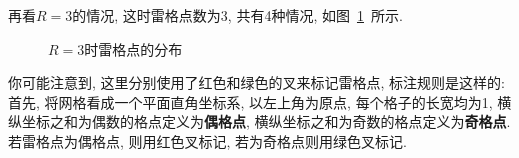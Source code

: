 \documentclass{ctexart}
\newcommand{\redcross}[2]{
    \begin{scope}[thick,color = red,shift={(#1,#2)}]
        \draw (0.05,-0.05) -- (-0.05,0.05);
        \draw (-0.05,-0.05) -- (0.05,0.05);
    \end{scope}
}
\newcommand{\greencross}[2]{
    \begin{scope}[thick,color = green,shift={(#1,#2)}]
        \draw (0.05,-0.05) -- (-0.05,0.05);
        \draw (-0.05,-0.05) -- (0.05,0.05);
    \end{scope}
}
\begin{document}
再看$R = 3$的情况, 这时雷格点数为3, 共有4种情况, 如图\ \ref{example3}\ 所示.
\begin{figure}[ht]
    \caption{$R=3$时雷格点的分布}
    \label{example3}
\end{figure}

你可能注意到, 这里分别使用了红色和绿色的叉来标记雷格点, 标注规则是这样的: 首先, 将网格看成一个平面直角坐标系, 以左上角为原点, 每个格子的长宽均为1, 横纵坐标之和为偶数的格点定义为\textbf{偶格点}, 横纵坐标之和为奇数的格点定义为\textbf{奇格点}. 若雷格点为偶格点, 则用红色叉标记, 若为奇格点则用绿色叉标记.
\end{document}
